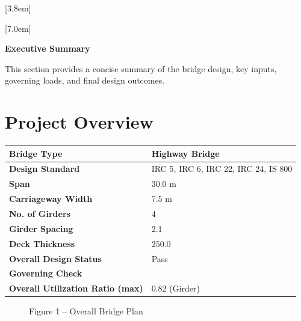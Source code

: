 \documentclass[12pt,a4paper]{report}
\numberwithin{table}{chapter}
\numberwithin{figure}{chapter}
\begin{document}
[3.8em]
  {\normalfont}
  {\contentslabel{2.3em}}
  {\hspace*{-2.3em}}
  {\hfill\contentspage}

[7.0em]
  {\normalfont}
  {\contentslabel{3.2em}}
  {\hspace*{-3.2em}}
  {\hfill\contentspage}

\newpage
\renewcommand{\contentsname}{\centering\Large\bfseries Table of Contents}
\tableofcontents


\newpage
{\centering\Large\bfseries Executive Summary\par}
\vspace{0.8em}

This section provides a concise summary of the bridge design, key inputs, governing loads, and final design outcomes.

\section*{Project Overview}
\label{sec:project-overview}


\begin{tabular}{|L{5.5cm}|L{8.5cm}|}
\hline
\textbf{Bridge Type} & Highway Bridge \\
\hline
\textbf{Design Standard} & IRC 5, IRC 6, IRC 22, IRC 24, IS 800 \\
\hline
\textbf{Span} & 30.0 m \\
\hline
\textbf{Carriageway Width} & 7.5 m \\
\hline
\textbf{No. of Girders} & 4 \\
\hline
\textbf{Girder Spacing} & 2.1 \\
\hline
\textbf{Deck Thickness} & 250.0 \\
\hline
\textbf{Overall Design Status} & Pass \\
\hline
\textbf{Governing Check} &  \\
\hline
\textbf{Overall Utilization Ratio (max)} & 0.82 (Girder) \\
\hline
\end{tabular}


\begin{figure}[H]
\centering
{}
\caption*{Figure 1 -- Overall Bridge Plan}
\end{figure}
\end{document}
